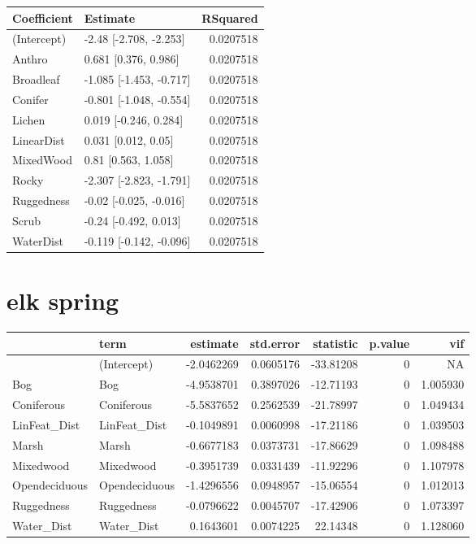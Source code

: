 \documentclass[]{article}
\begin{document}
\begin{tabular}{llr}
\toprule
Coefficient & Estimate & RSquared\\
\midrule
(Intercept) & -2.48 [-2.708, -2.253] & 0.0207518\\
Anthro & 0.681 [0.376, 0.986] & 0.0207518\\
Broadleaf & -1.085 [-1.453, -0.717] & 0.0207518\\
Conifer & -0.801 [-1.048, -0.554] & 0.0207518\\
Lichen & 0.019 [-0.246, 0.284] & 0.0207518\\
LinearDist & 0.031 [0.012, 0.05] & 0.0207518\\
MixedWood & 0.81 [0.563, 1.058] & 0.0207518\\
Rocky & -2.307 [-2.823, -1.791] & 0.0207518\\
Ruggedness & -0.02 [-0.025, -0.016] & 0.0207518\\
Scrub & -0.24 [-0.492, 0.013] & 0.0207518\\
WaterDist & -0.119 [-0.142, -0.096] & 0.0207518\\
\bottomrule
\end{tabular}

\section{elk spring}\label{elk-spring}

\begin{tabular}{llrrrrr}
\toprule
  & term & estimate & std.error & statistic & p.value & vif\\
\midrule
 & (Intercept) & -2.0462269 & 0.0605176 & -33.81208 & 0 & NA\\
Bog & Bog & -4.9538701 & 0.3897026 & -12.71193 & 0 & 1.005930\\
Coniferous & Coniferous & -5.5837652 & 0.2562539 & -21.78997 & 0 & 1.049434\\
LinFeat\_Dist & LinFeat\_Dist & -0.1049891 & 0.0060998 & -17.21186 & 0 & 1.039503\\
Marsh & Marsh & -0.6677183 & 0.0373731 & -17.86629 & 0 & 1.098488\\
Mixedwood & Mixedwood & -0.3951739 & 0.0331439 & -11.92296 & 0 & 1.107978\\
Opendeciduous & Opendeciduous & -1.4296556 & 0.0948957 & -15.06554 & 0 & 1.012013\\
Ruggedness & Ruggedness & -0.0796622 & 0.0045707 & -17.42906 & 0 & 1.073397\\
Water\_Dist & Water\_Dist & 0.1643601 & 0.0074225 & 22.14348 & 0 & 1.128060\\
\bottomrule
\end{tabular}
\end{document}
